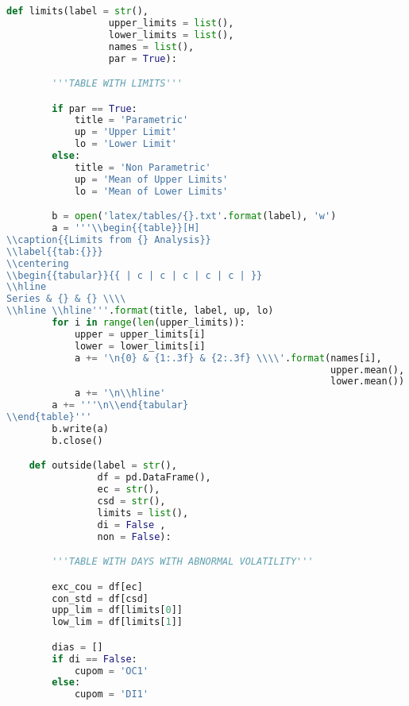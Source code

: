 \begin{lstlisting}[language=Python]
    def limits(label = str(),
                  upper_limits = list(),
                  lower_limits = list(),
                  names = list(),
                  par = True):

        '''TABLE WITH LIMITS'''

        if par == True:
            title = 'Parametric'
            up = 'Upper Limit'
            lo = 'Lower Limit'
        else:
            title = 'Non Parametric'
            up = 'Mean of Upper Limits'
            lo = 'Mean of Lower Limits'

        b = open('latex/tables/{}.txt'.format(label), 'w')
        a = '''\\begin{{table}}[H]
\\caption{{Limits from {} Analysis}}
\\label{{tab:{}}}
\\centering
\\begin{{tabular}}{{ | c | c | c | c | c | }}
\\hline
Series & {} & {} \\\\
\\hline \\hline'''.format(title, label, up, lo)
        for i in range(len(upper_limits)):
            upper = upper_limits[i]
            lower = lower_limits[i]
            a += '\n{0} & {1:.3f} & {2:.3f} \\\\'.format(names[i],
                                                         upper.mean(),
                                                         lower.mean())
            a += '\n\\hline'
        a += '''\n\\end{tabular}
\\end{table}'''
        b.write(a)
        b.close()

    def outside(label = str(),
                df = pd.DataFrame(),
                ec = str(),
                csd = str(),
                limits = list(),
                di = False ,
                non = False):

        '''TABLE WITH DAYS WITH ABNORMAL VOLATILITY'''

        exc_cou = df[ec]
        con_std = df[csd]
        upp_lim = df[limits[0]]
        low_lim = df[limits[1]]

        dias = []
        if di == False:
            cupom = 'OC1'
        else:
            cupom = 'DI1'


\end{lstlisting}
